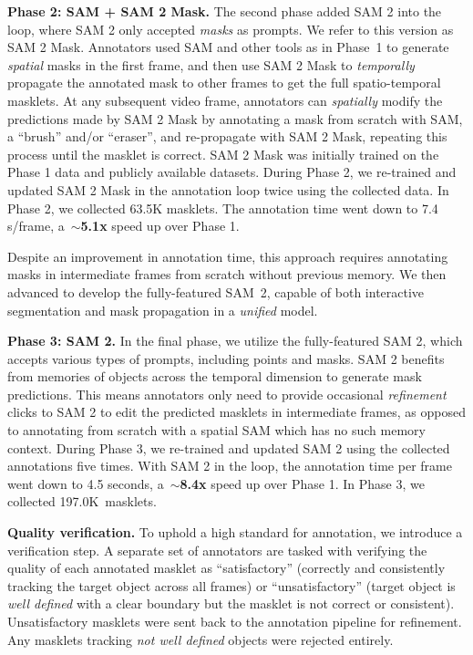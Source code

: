 \documentclass[]{fairmeta}
\renewcommand{\paragraph}[1]{\vspace{1.25mm}\noindent\textbf{#1}}
\newcommand{\saviPhaseTwoMasklets}{63.5K\xspace}
\newcommand{\saviPhaseThreeMasklets}{197.0K\xspace}  %
\renewcommand{\paragraph}[1]{\vspace{1.25mm}\noindent\textbf{#1}}
\begin{document}
\paragraph{Phase 2: SAM + SAM 2 Mask.} The second phase added SAM 2 into the loop, where SAM 2 only accepted \emph{masks} as prompts. We refer to this version as SAM 2 Mask. Annotators used SAM and other tools as in Phase~1 to generate \textit{spatial} masks in the first frame, and then use SAM 2 Mask to \textit{temporally} propagate the annotated mask to other frames to get the full spatio-temporal masklets. At any subsequent video frame, annotators can \textit{spatially} modify the predictions made by SAM 2 Mask by annotating a mask from scratch with SAM, a ``brush'' and/or ``eraser'', and re-propagate with SAM 2 Mask, repeating this process until the masklet is correct.  SAM 2 Mask was initially trained on the Phase 1 data and publicly available datasets. During Phase 2, we re-trained and updated SAM 2 Mask in the annotation loop twice using the collected data. %
In Phase 2, we collected \saviPhaseTwoMasklets masklets. The annotation time went down to 7.4 s/frame, a~$\sim$\textbf{5.1x} speed up over Phase 1.%


Despite an improvement in annotation time, this approach requires annotating masks in intermediate frames from scratch without previous memory. We then advanced to develop the fully-featured SAM~2, capable of both interactive segmentation and mask propagation in a \textit{unified} model.

\paragraph{Phase 3: SAM 2.} In the final phase, we utilize the fully-featured SAM 2, which accepts various types of prompts, including points and masks. SAM 2 benefits from memories of objects across the temporal dimension to generate mask predictions. This means annotators only need to provide occasional \textit{refinement} clicks to SAM 2 to edit the predicted masklets in intermediate frames, as opposed to annotating from scratch with a spatial SAM which has no such memory context. During Phase 3, we re-trained and updated SAM 2 using the collected annotations five times. With SAM 2 in the loop, the annotation time per frame went down to 4.5 seconds, a~$\sim$\textbf{8.4x} speed up over Phase 1. In Phase 3, we collected \saviPhaseThreeMasklets~masklets.

\paragraph{Quality verification.} To uphold a high standard for annotation, we introduce a verification step. A separate set of annotators are tasked with verifying the quality of each annotated masklet as ``satisfactory'' (correctly and consistently tracking the target object across all frames) or ``unsatisfactory'' (target object is \textit{well defined} with a clear boundary but the masklet is not correct or consistent). Unsatisfactory masklets were sent back to the annotation pipeline for refinement. Any masklets tracking \textit{not well defined} objects were rejected entirely.
\end{document}
